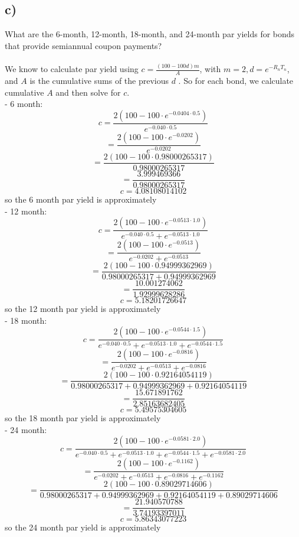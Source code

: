 \documentclass{article}
\begin{document}
{\subsection*{c)}
What are the 6-month, 12-month, 18-month, and 24-month par yields for bonds that provide semiannual coupon payments? \\ \\
We know to calculate par yield using \(c = \frac{(100 - 100d) m}{A}\), with \(m = 2, d = e^{-R_n T_n}\), and \(A\) is the cumulative sums of the previous \(d\) . So for each bond, we calculate cumulative \(A\) and then solve for \(c\). \\
- 6 month: 
\[
  c = \frac{2(100 - 100 \cdot e^{-0.0404 \cdot 0.5})}{e^{-0.040 \cdot 0.5}}
\]
\[
  = \frac{2(100 - 100 \cdot e^{-0.0202})}{e^{-0.0202}}
\]
\[
  = \frac{2(100 - 100 \cdot 0.98000265317)}{0.98000265317}
\]
\[
  = \frac{3.999469366}{0.98000265317}
\]
\[
  c = 4.08108014102
\]
so the 6 month par yield is approximately  \\ 
- 12 month: 
\[
  c = \frac{2(100 - 100 \cdot e^{-0.0513 \cdot 1.0})}{e^{-0.040 \cdot 0.5} + e^{-0.0513 \cdot 1.0}}
\]
\[
  = \frac{2(100 - 100 \cdot e^{-0.0513})}{e^{-0.0202} + e^{-0.0513}}
\]
\[
  = \frac{2(100 - 100 \cdot 0.94999362969)}{0.98000265317 + 0.94999362969}
\]
\[
  = \frac{10.001274062}{1.92999628286}
\]
\[
  c = 5.18201726647
\]
so the 12 month par yield is approximately  \\ 
- 18 month: 
\[
  c = \frac{2(100 - 100 \cdot e^{-0.0544 \cdot 1.5})}{e^{-0.040 \cdot 0.5} + e^{-0.0513 \cdot 1.0} + e^{-0.0544 \cdot 1.5}}
\]
\[
  = \frac{2(100 - 100 \cdot e^{-0.0816})}{e^{-0.0202} + e^{-0.0513} + e^{-0.0816}}
\]
\[
  = \frac{2(100 - 100 \cdot 0.92164054119)}{0.98000265317 + 0.94999362969 + 0.92164054119}
\]
\[
  = \frac{15.671891762}{2.85163682405}
\]
\[
  c = 5.49575304605
\]
so the 18 month par yield is approximately  \\ 
- 24 month: 
\[
  c = \frac{2(100 - 100 \cdot e^{-0.0581 \cdot 2.0})}{e^{-0.040 \cdot 0.5} + e^{-0.0513 \cdot 1.0} + e^{-0.0544 \cdot 1.5} + e^{-0.0581 \cdot 2.0}}
\]
\[
  = \frac{2(100 - 100 \cdot e^{-0.1162})}{e^{-0.0202} + e^{-0.0513} + e^{-0.0816} + e^{-0.1162}}
\]
\[
  = \frac{2(100 - 100 \cdot 0.89029714606)}{0.98000265317 + 0.94999362969 + 0.92164054119 + 0.89029714606}
\]
\[
  = \frac{21.940570788}{3.74193397011}
\]
\[
  c = 5.86343077223
\]
so the 24 month par yield is approximately  \\ 

}
\end{document}
